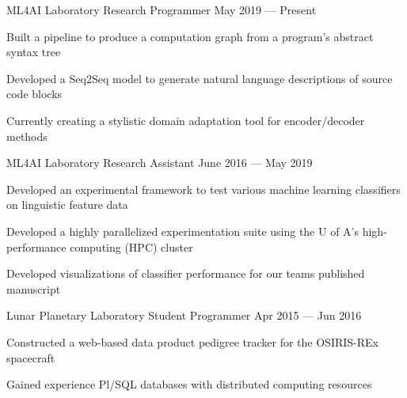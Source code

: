 

\begin{cventries}

  \cventry
    {ML4AI Laboratory} %
    {Research Programmer} %
    {May 2019 --- Present} %
    {} %
    {
      \begin{cvitems} %
        \item Built a pipeline to produce a computation graph from a program’s abstract syntax tree
        \item Developed a Seq2Seq model to generate natural language descriptions of source code blocks
        \item Currently creating a stylistic domain adaptation tool for encoder/decoder methods
      \end{cvitems}
    }

  \cventry
    {ML4AI Laboratory} %
    {Research Assistant} %
    {June 2016 --- May 2019} %
    {} %
    {
      \begin{cvitems} %
        \item Developed an experimental framework to test various machine learning classifiers on linguistic feature data
        \item Developed a highly parallelized experimentation suite using the U of A’s high-performance computing (HPC) cluster
        \item Developed visualizations of classifier performance for our teams published manuscript
      \end{cvitems}
    }

  \cventry
    {Lunar Planetary Laboratory} %
    {Student Programmer} %
    {Apr 2015 --- Jun 2016} %
    {} %
    {
      \begin{cvitems} %
        \item Constructed a web-based data product pedigree tracker for the OSIRIS-REx spacecraft
        \item Gained experience Pl/SQL databases with distributed computing resources
      \end{cvitems}
    }

\end{cventries}
